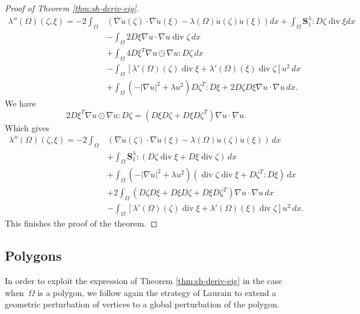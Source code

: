 \documentclass[JEP,XML,SOM,Unicode,ThmDefs,NoFloatCountersInSection,published]{cedram}
\theoremstyle{plain}
\theoremstyle{definition}
\newcommand{\di}{\operatorname{div}}
\newcommand{\bo}[1]{{\boldsymbol#1}}
\begin{document}
\begin{proof}[Proof of Theorem \ref{thm:sh-deriv-eig}]
\begin{align*}
\lambda''(\Omega)(\zeta,\xi)  = -2\int_\Omega&\left(\nabla \dot u(\zeta)\cdot \nabla \dot u(\xi) - \lambda(\Omega)\dot u(\zeta)\dot u(\xi)\right)dx + \int_\Omega \bo S_1^\lambda :D\zeta \di \xi dx\\
&-\int_\Omega 2D\xi \nabla u \cdot \nabla u \di \zeta\, dx\\
&+\int_\Omega 4 D\xi^T \nabla u \odot \nabla u :D\zeta\, dx \\
& - \int_\Omega [\lambda'(\Omega)(\zeta) \di \xi +\lambda'(\Omega)(\xi)\di \zeta] u^2\, dx\\
& +\int_\Omega (-|\nabla u|^2+\lambda u^2) D\zeta^T: D\xi +2 D\zeta D\xi \nabla u \cdot \nabla u\, dx .
\end{align*}
We have
\[
2D\xi^T \nabla u \odot \nabla u :D\zeta = (D\xi D\zeta + D\xi D\zeta^T)\nabla u \cdot \nabla u.
\]
Which gives
\begin{align*}
\lambda''(\Omega)(\zeta,\xi) = -2\int_\Omega &\left(\nabla \dot u(\zeta)\cdot \nabla \dot u(\xi) -\lambda(\Omega)\dot u(\zeta)\dot u(\xi)\right)\, dx \\
&+ \int_\Omega \bo S_1^\lambda :(D\zeta \di \xi+D\xi \di \zeta)\, dx \\
&+\int_\Omega (-|\nabla u|^2+\lambda u^2)(\di \zeta \di \xi+D\zeta^T:D\xi)\, dx\\
&+2\int_\Omega (D\zeta D\xi +D\xi D\zeta + D\xi D\zeta^T)\nabla u \cdot \nabla u\, dx\\
& - \int_\Omega [\lambda'(\Omega)(\zeta) \di \xi +\lambda'(\Omega)(\xi)\di \zeta] u^2\, dx.
\end{align*}
This finishes the proof of the theorem.
\end{proof}


\subsection{Polygons}
In order to exploit the expression of Theorem \ref{thm:sh-deriv-eig} in the case when~$\Omega$ is a polygon, we follow again the strategy of Laurain \cite{laurain2ndDeriv} to extend a geometric perturbation of vertices to a global perturbation of the polygon.
\end{document}
